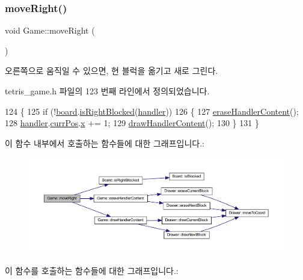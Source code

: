 \subsubsection{\texorpdfstring{move\+Right()}{moveRight()}}
{\footnotesize\ttfamily void Game\+::move\+Right (\begin{DoxyParamCaption}{ }\end{DoxyParamCaption})\hspace{0.3cm}{\ttfamily [inline]}}



오른쪽으로 움직일 수 있으면, 현 블럭을 옮기고 새로 그린다. 



tetris\+\_\+game.\+h 파일의 123 번째 라인에서 정의되었습니다.


\begin{DoxyCode}
124     \{
125         \textcolor{keywordflow}{if} (!\mbox{\hyperlink{class_game_af5bc546b0c766ecf2f7e008f750832ed}{board}}.\mbox{\hyperlink{class_board_ad38cdb8757f58a32b5747e2b7e0be277}{isRightBlocked}}(\mbox{\hyperlink{class_game_ae72b7259125e83dfd258c6a132394eec}{handler}}))
126         \{
127             \mbox{\hyperlink{class_game_a7ab3d17dc7bf72f0a59fbb7b17c6ce5a}{eraseHandlerContent}}();
128             \mbox{\hyperlink{class_game_ae72b7259125e83dfd258c6a132394eec}{handler}}.\mbox{\hyperlink{class_block_handler_a11bd634fdc179446f9c6751e2394999e}{currPos}}.\mbox{\hyperlink{struct_coord_a696eaa744360fc791d0e3b331c549dbe}{x}} += 1;
129             \mbox{\hyperlink{class_game_aa61075838d60bc5c850b72bc4804b7b8}{drawHandlerContent}}();
130         \}
131     \}
\end{DoxyCode}
이 함수 내부에서 호출하는 함수들에 대한 그래프입니다.\+:
\nopagebreak
\begin{figure}[H]
\begin{center}
\leavevmode
\includegraphics[width=350pt]{class_game_a36ee055aa2c311deea72c38f50814007_cgraph}
\end{center}
\end{figure}
이 함수를 호출하는 함수들에 대한 그래프입니다.\+:
